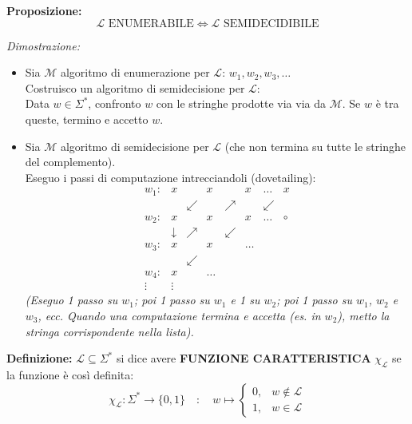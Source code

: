 \vspace{0.4cm}
\textbf{Proposizione:}
$$\mathcal{L} \text{ ENUMERABILE} \iff \mathcal{L} \text{ SEMIDECIDIBILE}$$

\textit{Dimostrazione:}
\begin{itemize}
    \item[$\implies$)] Sia $\mathcal{M}$ algoritmo di enumerazione per $\mathcal{L}$: $w_1, w_2, w_3, \dots$ \\
    Costruisco un algoritmo di semidecisione per $\mathcal{L}$: \\
    Data $w \in \Sigma^*$, confronto $w$ con le stringhe prodotte via via da $\mathcal{M}$. Se $w$ è tra queste, termino e accetto $w$.
    
    \item[$\impliedby$)] Sia $\mathcal{M}$ algoritmo di semidecisione per $\mathcal{L}$ (che non termina su tutte le stringhe del complemento). \\
    Eseguo i passi di computazione intrecciandoli (dovetailing):
    $$
    \renewcommand{\arraystretch}{1.2}
    \begin{array}{l|ccccccc}
    w_1: & x & & x & & x & \dots & x \\
         & & \swarrow & & \nearrow & & \swarrow & \\
    w_2: & x & & x & & x & \dots & \circ \\
         & \downarrow & \nearrow & & \swarrow & & & \\
    w_3: & x & & x & & \dots & & \\
         & & \swarrow & & & & & \\
    w_4: & x & & \dots & & & & \\
    \vdots & \vdots & & & & & &
    \end{array}
    $$
    \textit{(Eseguo 1 passo su $w_1$; poi 1 passo su $w_1$ e 1 su $w_2$; poi 1 passo su $w_1$, $w_2$ e $w_3$, ecc. Quando una computazione termina e accetta (es. in $w_2$), metto la stringa corrispondente nella lista).}\end{itemize}

\vspace{0.4cm}
\textbf{Definizione:} $\mathcal{L} \subseteq \Sigma^*$ si dice avere \textbf{FUNZIONE CARATTERISTICA} $\chi_\mathcal{L}$ se la funzione è così definita:
$$ 
\chi_\mathcal{L} : \Sigma^* \to \{0, 1\} \quad : \quad w \mapsto 
\begin{cases} 
0, & w \notin \mathcal{L} \\ 
1, & w \in \mathcal{L} 
\end{cases}
$$

